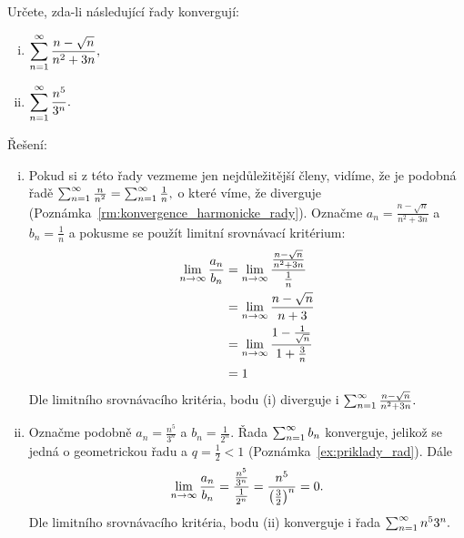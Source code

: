 \begin{example}
    Určete, zda-li následující řady konvergují:
    \begin{multicols}{2}
        \begin{enumerate}[(i)]
            \item $\displaystyle \sum_{n=1}^\infty \frac{n-\sqrt{n}}{n^2 + 3n},$
            \item $\displaystyle \sum_{n=1}^\infty \frac{n^5}{3^n}.$
        \end{enumerate}
    \end{multicols}
    Řešení:
    \begin{enumerate}[(i)]
        \item
            Pokud si z této řady vezmeme jen nejdůležitější členy, vidíme, že je podobná
            řadě $\sum_{n=1}^\infty \frac{n}{n^2} = \sum_{n=1}^\infty \frac{1}{n},$ o které víme, že diverguje 
            (Poznámka~\ref{rm:konvergence_harmonicke_rady}). Označme 
            $a_n = \frac{n-\sqrt{n}}{n^2 + 3n}$ a $b_n = \frac{1}{n}$ a pokusme se použít
            limitní srovnávací kritérium:
            \begin{align*}
                \lim_{n \to \infty} \frac{a_n}{b_n}
                &=\lim_{n \to \infty} \frac{\frac{n-\sqrt{n}}{n^2 + 3n}}{\frac{1}{n}} \\
                &= \lim_{n \to \infty} \frac{n - \sqrt{n}}{n + 3} \\
                &= \lim_{n \to \infty} \frac{1 - \frac{1}{\sqrt{n}}}{1 + \frac{3}{n}} \\
                &=1
            \end{align*}
            Dle limitního srovnávacího kritéria, bodu (i) diverguje i
            $\sum_{n=1}^\infty \frac{n-\sqrt{n}}{n^2 + 3n}.$
        \item Označme podobně $a_n = \frac{n^5}{3^n}$ a $b_n = \frac{1}{2^n}.$
            Řada $\sum_{n=1}^\infty b_n$ konverguje, jelikož se jedná o geometrickou řadu
            a $q = \frac{1}{2} < 1$ (Poznámka~\ref{ex:priklady_rad}).
            Dále
            $$\lim_{n \to \infty} \frac{a_n}{b_n} = \frac{\frac{n^5}{3^n}}{\frac{1}{2^n}}
            = \frac{n^5}{\left(\frac{3}{2}\right)^n} = 0.$$
            Dle limitního srovnávacího kritéria, bodu (ii) konverguje i řada 
            $\sum_{n=1}^\infty n^5{3^n}.$
    \end{enumerate}
\end{example}

